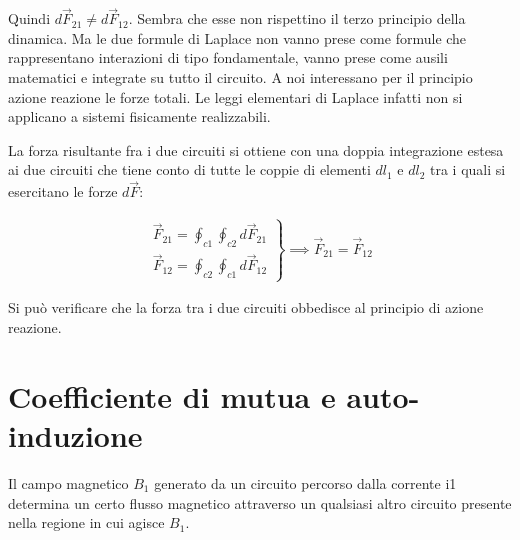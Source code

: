 Quindi $ d\vec{F}_{21} \neq d\vec{F}_{12}$. Sembra che esse non rispettino il terzo principio della dinamica. Ma le due formule di Laplace non vanno prese come formule che rappresentano interazioni di tipo fondamentale, vanno prese come ausili matematici e integrate su tutto il circuito. A noi interessano per il principio azione reazione le forze totali. Le leggi elementari di Laplace infatti non si applicano a sistemi fisicamente realizzabili.

La forza risultante fra i due circuiti si ottiene con una doppia integrazione estesa ai due circuiti che tiene conto di tutte le coppie di elementi $dl_1$ e $dl_2$ tra i quali si esercitano le forze $d\vec{F}$:

\begin{align*}
	\left.\begin{array}{ll}
		\vec{F}_{21} = \oint_{c1} \oint_{c2} d\vec{F}_{21} \\
		\vec{F}_{12} = \oint_{c2} \oint_{c1} d\vec{F}_{12}
	\end{array}\right\}
		\implies \vec{F}_{21} = \vec{F}_{12}
\end{align*}

Si può verificare che la forza tra i due circuiti obbedisce al principio di azione reazione.

\section{Coefficiente di mutua e auto-induzione}

Il campo magnetico $B_1$ generato da un circuito percorso dalla corrente i1 determina un certo flusso magnetico attraverso un qualsiasi altro circuito presente nella regione in cui agisce $B_1$.

